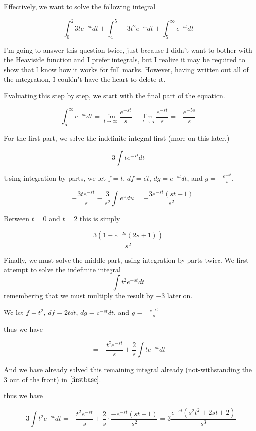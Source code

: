 \documentclass{article}
\begin{document}
Effectively, we want to solve the following integral

$$\int_{0}^{2} 3t e^{-st} dt  + \int_{4}^{5} -3t^2 e^{-st} dt + \int_{5}^{\infty} e^{-st} dt$$

I'm going to answer this question twice, just because I didn't want to bother with the Heaviside function and I prefer integrals, but I realize it may be required to show that I know how it works for full marks. However, having written out all of the integration, I couldn't have the heart to delete it.


Evaluating this step by step, we start with the final part of the equation.

\begin{equation}\label{last}
\int_{5}^{\infty} e^{-st} dt = \lim_{t \to \infty} \frac{e^{-st}}{s} - \lim_{t \to 5} \frac{e^{-st}}{s} = - \frac{e^{-5s}}{s}
\end{equation}

For the first part, we solve the indefinite integral first (more on this later.)

$$3\int t e^{-st} dt$$

Using integration by parts, we let $f=t$, $df=dt$, $dg=e^{-st}dt$, and $g=-\frac{e^{-st}}{s}$.

\begin{equation}\label{firstbase}
 = -\frac{3te^{-st}}{s}-\frac{3}{s^2}\int e^u du = -\frac{3e^{-st}(st+1)}{s^2}
\end{equation}

Between $t=0$ and $t=2$ this is simply

\begin{equation}\label{first}
\frac{3(1-e^{-2s}(2s+1))}{s^2}
\end{equation}


Finally, we must solve the middle part, using integration by parts twice.
We first attempt to solve the indefinite integral
$$\int t^2 e^{-st} dt$$
remembering that we must multiply the result by $-3$ later on.

We let $f=t^2$, $df=2tdt$, $dg=e^{-st}dt$, and $g=-\frac{e^{-st}}{s}$

thus we have

$$=-\frac{t^2e^{-st}}{s}+\frac{2}{s} \int t e^{-st} dt$$

And we have already solved this remaining integral already (not-withstanding the $3$ out of the front) in $\eqref{firstbase}$.

thus we have

$$-3 \int t^2 e^{-st} dt = -\frac{t^2e^{-st}}{s}+\frac{2}{s} \cdot \frac{-e^{-st}(st+1)}{s^2} = 3\frac{e^{-st}\left(s^2t^2+2st+2\right)}{s^3}$$
\end{document}
